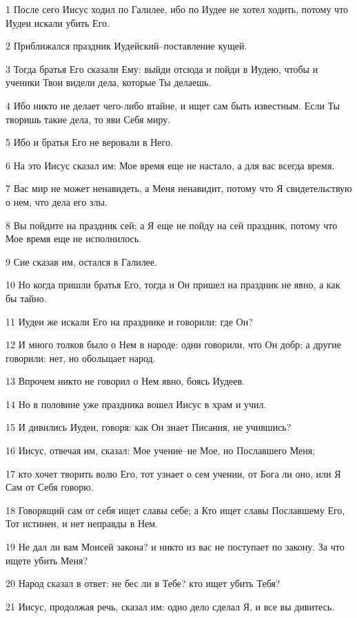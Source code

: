 \par 1 После сего Иисус ходил по Галилее, ибо по Иудее не хотел ходить, потому что Иудеи искали убить Его.
\par 2 Приближался праздник Иудейский--поставление кущей.
\par 3 Тогда братья Его сказали Ему: выйди отсюда и пойди в Иудею, чтобы и ученики Твои видели дела, которые Ты делаешь.
\par 4 Ибо никто не делает чего-либо втайне, и ищет сам быть известным. Если Ты творишь такие дела, то яви Себя миру.
\par 5 Ибо и братья Его не веровали в Него.
\par 6 На это Иисус сказал им: Мое время еще не настало, а для вас всегда время.
\par 7 Вас мир не может ненавидеть, а Меня ненавидит, потому что Я свидетельствую о нем, что дела его злы.
\par 8 Вы пойдите на праздник сей; а Я еще не пойду на сей праздник, потому что Мое время еще не исполнилось.
\par 9 Сие сказав им, остался в Галилее.
\par 10 Но когда пришли братья Его, тогда и Он пришел на праздник не явно, а как бы тайно.
\par 11 Иудеи же искали Его на празднике и говорили: где Он?
\par 12 И много толков было о Нем в народе: одни говорили, что Он добр; а другие говорили: нет, но обольщает народ.
\par 13 Впрочем никто не говорил о Нем явно, боясь Иудеев.
\par 14 Но в половине уже праздника вошел Иисус в храм и учил.
\par 15 И дивились Иудеи, говоря: как Он знает Писания, не учившись?
\par 16 Иисус, отвечая им, сказал: Мое учение--не Мое, но Пославшего Меня;
\par 17 кто хочет творить волю Его, тот узнает о сем учении, от Бога ли оно, или Я Сам от Себя говорю.
\par 18 Говорящий сам от себя ищет славы себе; а Кто ищет славы Пославшему Его, Тот истинен, и нет неправды в Нем.
\par 19 Не дал ли вам Моисей закона? и никто из вас не поступает по закону. За что ищете убить Меня?
\par 20 Народ сказал в ответ: не бес ли в Тебе? кто ищет убить Тебя?
\par 21 Иисус, продолжая речь, сказал им: одно дело сделал Я, и все вы дивитесь.
